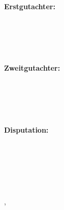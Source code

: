 \begin{minipage}[t]{.27\textwidth}
	\raggedleft
	\textbf{Erstgutachter:}
\end{minipage}
\hspace*{25pt}
\begin{minipage}[t]{.40\textwidth}
	{\Large \thesisFirstReviewer} \\
	{\small \thesisFirstReviewerUniversity} \\[-1mm]
	{\small \thesisFirstReviewerCity}
\end{minipage} \\[5mm]
\begin{minipage}[t]{.27\textwidth}
	\raggedleft
	\textbf{Zweitgutachter:}
\end{minipage}
\hspace*{25pt}
\begin{minipage}[t]{.40\textwidth}
	{\Large \thesisSecondReviewer} \\
	{\small \thesisSecondReviewerUniversity} \\[-1mm]
	{\small \thesisSecondReviewerCity}
\end{minipage} \\[10mm]
\begin{minipage}[t]{.27\textwidth}
	\raggedleft
	\textbf{Disputation:}
\end{minipage}
\hspace*{25pt}
\begin{minipage}[t]{.40\textwidth}
	\thesisDefense \\
\end{minipage} \\[10mm]


\vfill
{
	\small
	\textbf{\thesisDegree\ \thesisName} \\
	\textit{\thesisTitle} \\
	\thesisSubject, \thesisDate \\[1.0em]
	\textbf{\thesisOrganization} \\
	\thesisOrganizationDepartment \\
	\textit{\thesisOrganizationGroup} \\
	\thesisOrganizationStreetAddress \\
	\thesisOrganizationPostalCode\ \thesisOrganizationCity \\[1.0em]
	\textbf{\thesisUniversity} \\
	\thesisUniversityDepartment \\
	\thesisUniversityInstitute \\
	\textit{\thesisUniversityGroup} \\
	\thesisUniversityStreetAddress \\
	\thesisUniversityPostalCode\ \thesisUniversityCity

}
